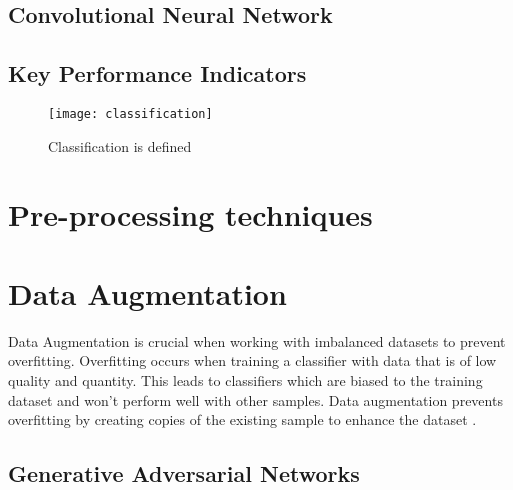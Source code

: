 \subsection{Convolutional Neural Network}

\subsection{Key Performance Indicators}

\begin{figure}
    \centering
    \texttt{[image: classification]}
    \caption[Classification scatter plot diagram]{Classification is defined \citep{suthaharan_machine_2015}}
    \label{fig:classification}
\end{figure}

\section{Pre-processing techniques}

\section{Data Augmentation}
Data Augmentation is crucial when working with imbalanced datasets to prevent overfitting.
Overfitting occurs when training a classifier with data that is of low quality and quantity.
This leads to classifiers which are biased to the training dataset and won't perform well with other samples.
Data augmentation prevents overfitting by creating copies of the existing sample to enhance the dataset \cite{lemley_smart_2017}.

\subsection{Generative Adversarial Networks}
